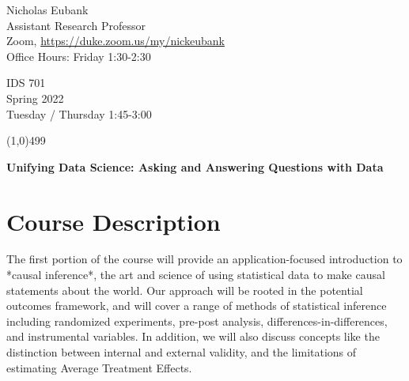 \documentclass[12pt]{article}
\begin{document}
\singlespacing






\thispagestyle{empty}
\begin{minipage}[t]{.5\textwidth}
	Nicholas Eubank \\
	 Assistant Research Professor\\
	 Zoom, \url{https://duke.zoom.us/my/nickeubank} \\
	 Office Hours: Friday 1:30-2:30
     \vspace*{0.1cm}
\end{minipage}
\begin{minipage}[t]{.5\textwidth}
	\begin{flushright}  IDS 701 \\
	Spring 2022\\
	Tuesday / Thursday 1:45-3:00 
    \vspace*{0.1cm}
\end{flushright}
\end{minipage}


\line(1,0){499}

\vspace{.35in}

\begin{center}
	\textbf{\LARGE{Unifying Data Science: Asking and Answering Questions with Data} }
\end{center}








\section{Course Description}

The first portion of the course will provide an application-focused introduction to *causal inference*, the art and science of using statistical data to make causal statements about the world. Our approach will be rooted in the potential outcomes framework, and will cover a range of methods of statistical inference including randomized experiments, pre-post analysis, differences-in-differences, and instrumental variables. In addition, we will also discuss concepts like the distinction between internal and external validity, and the limitations of estimating Average Treatment Effects. 
\end{document}
